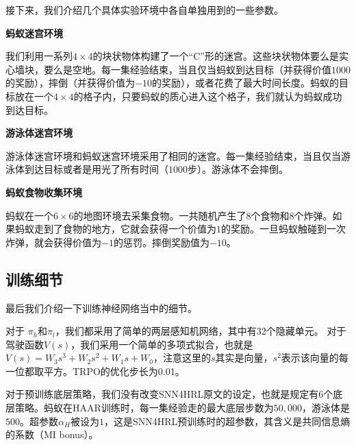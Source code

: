 接下来，我们介绍几个具体实验环境中各自单独用到的一些参数。

\textbf{蚂蚁迷宫环境}

我们利用一系列$4\times4$的块状物体构建了一个``C''形的迷宫。这些块状物体要么是实心墙块，要么是空地。每一集经验结束，当且仅当蚂蚁到达目标（并获得价值$1000$的奖励），摔倒（并获得价值为$-10$的奖励），或者花费了最大时间长度。蚂蚁的目标放在一个$4\times4$的格子内，只要蚂蚁的质心进入这个格子，我们就认为蚂蚁成功到达目标。

\textbf{游泳体迷宫环境}

游泳体迷宫环境和蚂蚁迷宫环境采用了相同的迷宫。每一集经验结束，当且仅当游泳体到达目标或者是用光了所有时间（$1000$步）。游泳体不会摔倒。

\textbf{蚂蚁食物收集环境}

蚂蚁在一个$6\times6$的地图环境去采集食物。一共随机产生了8个食物和8个炸弹。如果蚂蚁走到了食物的地方，它就会获得一个价值为$1$的奖励。一旦蚂蚁触碰到一次炸弹，就会获得价值为$-1$的惩罚。摔倒奖励值为$-10$。

\subsection{训练细节}
最后我们介绍一下训练神经网络当中的细节。

对于 $\pi_h$和$\pi_l$，我们都采用了简单的两层感知机网络，其中有32个隐藏单元。
对于驾驶函数$V(s)$，我们采用一个简单的多项式拟合，也就是$V(s) = W_3s^3 + W_2s^2 + W_1s + W_0$，注意这里的$s$其实是向量，$s^2$表示该向量的每一位都取平方。TRPO的优化步长为0.01。

对于预训练底层策略，我们没有改变SNN4HRL原文的设定，也就是规定有6个底层策略。蚂蚁在HAAR训练时，每一集经验走的最大底层步数为$50,000$，游泳体是$500$。超参数$\alpha_H$被设为$1$，这是SNN4HRL预训练时的超参数，其含义是共同信息熵的系数（MI bonus）。

